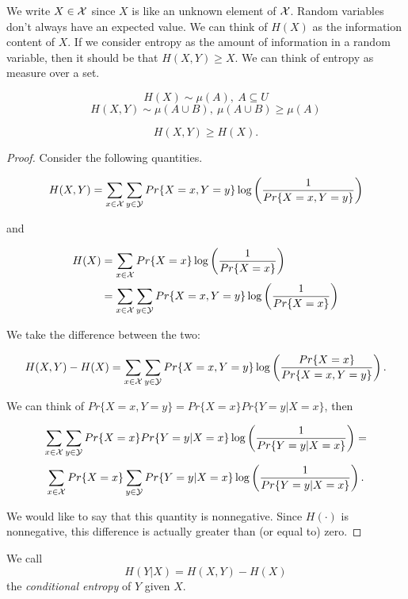 We write $X \in \mathcal{X}$ since $X$ is like an unknown element of $\mathcal{X}$. Random variables don't always have an expected value. We can think of $H(X)$ as the information content of $X$. If we consider entropy as the amount of information in a random variable, then it should be that $H(X, Y) \geq X$. We can think of entropy as  measure over a set.

\[
 H(X) \sim \mu(A),\ A \subseteq U
\]
\[
H(X, Y) \sim \mu(A \cup B),\ \mu(A \cup B) \geq \mu(A)
\]

\begin{prop}
  \begin{equation}
H(X, Y) \geq H(X).   
  \end{equation}
\end{prop}
\begin{proof}
Consider the following quantities.

\begin{equation}
H(X, Y) = \sum_{x\in \mathcal{X}} \sum_{y \in \mathcal{Y}} Pr\{X=x, Y=y\}\log\left(\dfrac{1}{Pr\{X=x, Y=y\}}\right) 
\end{equation}

and

\begin{equation}
\begin{align*}
 H(X) &= \sum_{x\in \mathcal{X}}Pr\{X=x\}\log\left(\dfrac{1}{Pr\{X=x\}}\right)\\
 &=\sum_{x\in\mathcal{X}}\sum_{y\in\mathcal{Y}}Pr\{X=x, Y=y\}\log\left(\dfrac{1}{Pr\{X=x\}}\right) 
\end{align*} 
\end{equation}

We take the difference between the two:

\[
 H(X, Y) - H(X) =  \sum_{x\in\mathcal{X}}\sum_{y\in\mathcal{Y}}Pr\{X=x, Y=y\}\log\left(\dfrac{Pr\{X=x\}}{Pr\{X=x, Y=y\}}\right).
\]

We can think of $Pr\{X=x, Y=y\} = Pr\{X=x\}Pr\{Y=y | X=x\}$, then

\[
  \sum_{x\in \mathcal{X}} \sum_{y \in \mathcal{Y}} Pr\{X=x\}Pr\{Y=y | X=x\}\log\left(\dfrac{1}{Pr\{Y=y|X=x\}}\right) =
\]
\[
 \sum_{x\in \mathcal{X}}Pr\{X=x\}\sum_{y \in \mathcal{Y}} Pr\{Y=y | X=x\}\log\left(\dfrac{1}{Pr\{Y=y|X=x\}}\right).
\]

We would like to say that this quantity is nonnegative. Since $H(\cdot)$ is nonnegative, this difference is actually greater than (or equal to) zero.
\end{proof}

\begin{definition}
We call
\begin{equation}
 H(Y|X) = H(X, Y) - H(X)
\end{equation}
the \emph{conditional entropy} of $Y$ given $X$.

\end{definition}


